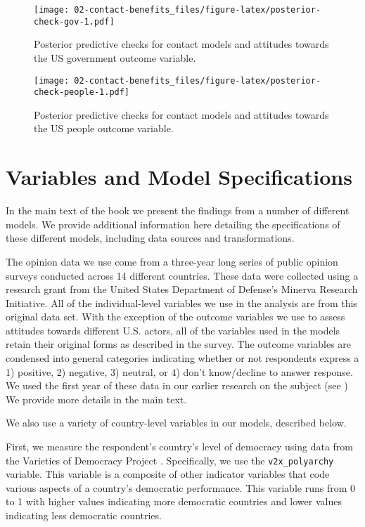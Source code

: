 \documentclass[
]{book}
\theoremstyle{definition}
\theoremstyle{definition}
\theoremstyle{definition}
\theoremstyle{definition}
\theoremstyle{remark}
\begin{document}
\begin{figure}
\centering
\texttt{[image: 02-contact-benefits\_files/figure-latex/posterior-check-gov-1.pdf]}
\caption{\label{fig:posterior-check-gov}Posterior predictive checks for contact models and attitudes towards the US government outcome variable.}
\end{figure}

\begin{figure}
\centering
\texttt{[image: 02-contact-benefits\_files/figure-latex/posterior-check-people-1.pdf]}
\caption{\label{fig:posterior-check-people}Posterior predictive checks for contact models and attitudes towards the US people outcome variable.}
\end{figure}

\hypertarget{variables-and-model-specifications}{%
\section{Variables and Model Specifications}\label{variables-and-model-specifications}}

In the main text of the book we present the findings from a number of different models. We provide additional information here detailing the specifications of these different models, including data sources and transformations.

The opinion data we use come from a three-year long series of public opinion surveys conducted across 14 different countries. These data were collected using a research grant from the United States Department of Defense's Minerva Research Initiative. All of the individual-level variables we use in the analysis are from this original data set. With the exception of the outcome variables we use to assess attitudes towards different U.S. actors, all of the variables used in the models retain their original forms as described in the survey. The outcome variables are condensed into general categories indicating whether or not respondents express a 1) positive, 2) negative, 3) neutral, or 4) don't know/decline to answer response. We used the first year of these data in our earlier research on the subject (see \citet{Allen2020}) We provide more details in the main text.

We also use a variety of country-level variables in our models, described below.

First, we measure the respondent's country's level of democracy using data from the Varieties of Democracy Project \citep{VDemV111, Vdemcodebook2021}. Specifically, we use the \texttt{v2x\_polyarchy} variable. This variable is a composite of other indicator variables that code various aspects of a country's democratic performance. This variable runs from 0 to 1 with higher values indicating more democratic countries and lower values indicating less democratic countries.
\end{document}
